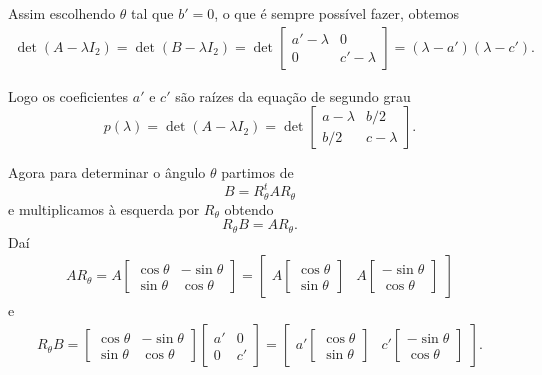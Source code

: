 Assim escolhendo $\theta$ tal que $b' = 0$, o que é sempre possível fazer, obtemos
\begin{align*}
  \det(A - \lambda I_2) = \det(B - \lambda I_2) = \det \begin{bmatrix}
    a' - \lambda & 0\\
    0 & c' - \lambda
  \end{bmatrix} = (\lambda - a')(\lambda - c').
\end{align*}

Logo os coeficientes $a'$ e $c'$ são raízes da equação de segundo grau
\begin{equation}
  p(\lambda) = \det(A - \lambda I_2) = \det \begin{bmatrix}
    a - \lambda & b/2\\
    b/2 & c - \lambda
  \end{bmatrix}.
\end{equation}

Agora para determinar o ângulo $\theta$ partimos de
\[
  B = R_\theta^t A R_\theta
\]
e multiplicamos à esquerda por $R_\theta$ obtendo
\[
  R_\theta B = AR_\theta.
\]
Daí
\begin{align*}
  AR_\theta = A \begin{bmatrix}
    \cos\theta & -\sin\theta\\
    \sin\theta & \cos\theta
  \end{bmatrix} = \begin{bmatrix}
    A \begin{bmatrix}
      \cos\theta \\ \sin\theta
    \end{bmatrix} & A \begin{bmatrix}
      -\sin\theta\\ \cos\theta
    \end{bmatrix}
  \end{bmatrix}
\end{align*}
e
\begin{align*}
  R_\theta B = \begin{bmatrix}
    \cos\theta & -\sin\theta\\
    \sin\theta & \cos\theta
  \end{bmatrix} \begin{bmatrix}
    a' & 0\\
    0 & c'
  \end{bmatrix} = \begin{bmatrix}
    a' \begin{bmatrix}
      \cos\theta \\ \sin\theta
    \end{bmatrix} & c' \begin{bmatrix}
      -\sin\theta\\ \cos\theta
    \end{bmatrix}
  \end{bmatrix}.
\end{align*}

